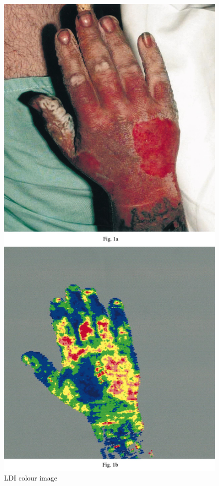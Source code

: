 \documentclass[paper=letter, fontsize=11pt]{scrartcl}
\numberwithin{equation}{section}		%
\numberwithin{figure}{section}			%
\numberwithin{table}{section}			%
\begin{document}
\begin{figure}[H]
\begin{minipage}[t]{0.44\textwidth}
        \includegraphics[scale=0.15]{LDI_colour_image.jpg}
        \caption{LDI colour image}
    \end{minipage}
\end{figure}
\end{document}
